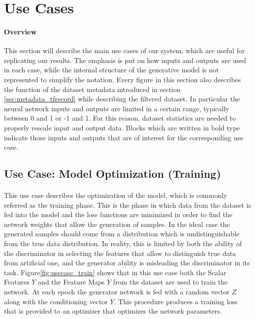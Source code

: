 \section{Use Cases}
\label{sec:usecases}
\paragraph{Overview} This section will describe the main use cases of our system, which are useful for replicating our results. The emphasis is put on how inputs and outputs are used in each case, while the internal structure of the generative model is not represented to simplify the notation. Every figure in this section also describes the function of the dataset metadata introduced in section \ref{sec:metadata_tfrecord} while describing the filtered dataset. In particular the neural network inputs and outputs are limited in a certain range, typically between 0 and 1 or -1 and 1. For this reason, dataset statistics are needed to properly rescale input and output data. Blocks which are written in bold type indicate those inputs and outputs that are of interest for the corresponding use case.

\subsection{Use Case: Model Optimization (Training)}
\label{sec:usecase_train}
\paragraph{} This use case describes the optimization of the model, which is commonly referred as the training phase. This is the phase in which data from the dataset is fed into the model and the loss functions are minimized in order to find the network weights that allow the generation of samples. In the ideal case the generated samples should come from a distribution which is undistinguishable from the true data distribution. In reality, this is limited by both the ability of the discriminator in selecting the features that allow to distinguish true data from artificial one, and the generator ability is misleading the discriminator in its task. Figure\ref{fig:usecase_train} shows that in this use case both the Scalar Features $Y$ and the Feature Maps $Y$ from the dataset are used to train the network. At each epoch the generator network is fed with a random vector $Z$ along with the conditioning vector $Y$. This procedure produces a training loss that is provided to an optimizer that optimizes the network parameters. 

